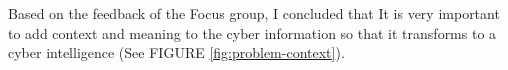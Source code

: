 Based on the feedback of the Focus group, I concluded that It is very important to add context and meaning to the cyber information so that it transforms to a cyber intelligence (See FIGURE  \ref{fig:problem-context}).
 





%



